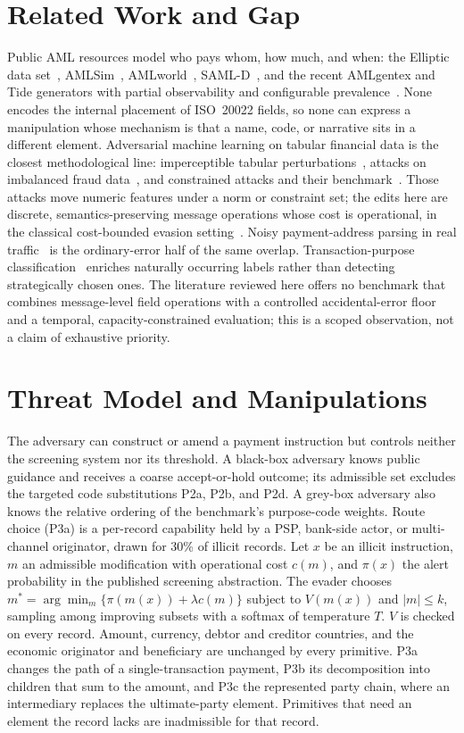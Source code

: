 \documentclass[conference]{IEEEtran}
\begin{document}
\section{Related Work and Gap}
Public AML resources model who pays whom, how much, and when: the Elliptic
data set~\cite{weber2019}, AMLSim~\cite{suzumura2021},
AMLworld~\cite{altman2023}, SAML-D~\cite{oztas2023}, and the recent AMLgentex
and Tide generators with partial observability and configurable
prevalence~\cite{ostman2025,beukel2026}. None encodes the internal placement
of ISO~20022 fields, so none can express a manipulation whose mechanism is
that a name, code, or narrative sits in a different element. Adversarial
machine learning on tabular financial data is the closest methodological
line: imperceptible tabular perturbations~\cite{ballet2019}, attacks on
imbalanced fraud data~\cite{cartella2021}, and constrained attacks and their
benchmark~\cite{simonetto2022,simonetto2024}. Those attacks move numeric
features under a norm or constraint set; the edits here are discrete,
semantics-preserving message operations whose cost is operational, in the
classical cost-bounded evasion setting~\cite{bruckner2011,biggio2013}. Noisy
payment-address parsing in real traffic~\cite{hammami2024} is the
ordinary-error half of the same overlap. Transaction-purpose
classification~\cite{busson2023} enriches naturally occurring labels rather
than detecting strategically chosen ones. The literature reviewed here offers no benchmark that combines
message-level field operations with a controlled accidental-error floor and
a temporal, capacity-constrained evaluation; this is a scoped observation,
not a claim of exhaustive priority.

\section{Threat Model and Manipulations}
The adversary can construct or amend a payment instruction but controls
neither the screening system nor its threshold. A black-box adversary knows
public guidance and receives a coarse accept-or-hold outcome; its admissible
set excludes the targeted code substitutions P2a, P2b, and P2d. A grey-box
adversary also knows the relative ordering of the benchmark's purpose-code
weights. Route choice (P3a) is a per-record capability held by a PSP,
bank-side actor, or multi-channel originator, drawn for 30\% of
illicit records. Let $x$ be an illicit instruction, $m$ an admissible
modification with operational cost $c(m)$, and $\pi(x)$ the alert probability
in the published screening abstraction. The evader chooses
$m^*=\arg\min_m\{\pi(m(x))+\lambda c(m)\}$ subject to $V(m(x))$ and $|m|\le
k$, sampling among improving subsets with a softmax of temperature $T$. $V$ is
checked on every record. Amount, currency, debtor and creditor countries, and
the economic originator and beneficiary are unchanged by every primitive.
P3a changes the path of a single-transaction payment, P3b its decomposition
into children that sum to the amount, and P3c the represented party chain,
where an intermediary replaces the ultimate-party element. Primitives that
need an element the record lacks are inadmissible for that record.
\end{document}
